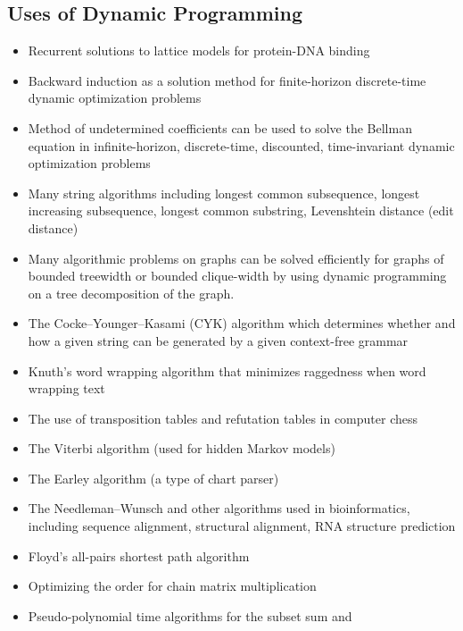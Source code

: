 
\begin{slide}
\section[-2]{Uses of Dynamic Programming}

\begin{PauseHighLight}
  \begin{itemize}\small\squeeze
  \item Recurrent solutions to lattice models for protein-DNA binding
  \item Backward induction as a solution method for finite-horizon
    discrete-time dynamic optimization problems 
  \item Method of undetermined coefficients can be used to solve the
    Bellman equation in infinite-horizon, discrete-time, discounted,
    time-invariant dynamic optimization problems 
  \item Many string algorithms including longest common subsequence,
    longest increasing subsequence, longest common substring,
    Levenshtein distance (edit distance) 
  \item Many algorithmic problems on graphs can be solved efficiently
    for graphs of bounded treewidth or bounded clique-width by using
    dynamic programming on a tree decomposition of the graph. 
  \item The Cocke–Younger–Kasami (CYK) algorithm which determines
    whether and how a given string can be generated by a given
    context-free grammar 
  \item Knuth's word wrapping algorithm that minimizes raggedness when
    word wrapping text 
  \item The use of transposition tables and refutation tables in
    computer chess 
  \item The Viterbi algorithm (used for hidden Markov models)
  \item The Earley algorithm (a type of chart parser)
  \item The Needleman–Wunsch and other algorithms used in
    bioinformatics, including sequence alignment, structural alignment,
    RNA structure prediction 
  \item Floyd's all-pairs shortest path algorithm
  \item Optimizing the order for chain matrix multiplication
  \item Pseudo-polynomial time algorithms for the subset sum and

\end{itemize}
\end{PauseHighLight}
\end{slide}
